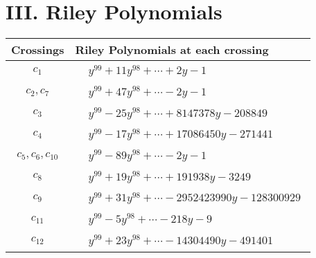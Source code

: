 \documentclass[1p]{elsarticle_modified}
\theoremstyle{definition}
\begin{document}
\centering \section*{ III. Riley Polynomials}
\begin{tabular}{m{50pt}|m{274pt}}
Crossings & \hspace{64pt}Riley Polynomials at each crossing \\
\hline $$\begin{aligned}c_{1}\end{aligned}$$&$\begin{aligned}
&y^{99}+11 y^{98}+\cdots+2 y-1
\end{aligned}$\\
\hline $$\begin{aligned}c_{2},c_{7}\end{aligned}$$&$\begin{aligned}
&y^{99}+47 y^{98}+\cdots-2 y-1
\end{aligned}$\\
\hline $$\begin{aligned}c_{3}\end{aligned}$$&$\begin{aligned}
&y^{99}-25 y^{98}+\cdots+8147378 y-208849
\end{aligned}$\\
\hline $$\begin{aligned}c_{4}\end{aligned}$$&$\begin{aligned}
&y^{99}-17 y^{98}+\cdots+17086450 y-271441
\end{aligned}$\\
\hline $$\begin{aligned}c_{5},c_{6},c_{10}\end{aligned}$$&$\begin{aligned}
&y^{99}-89 y^{98}+\cdots-2 y-1
\end{aligned}$\\
\hline $$\begin{aligned}c_{8}\end{aligned}$$&$\begin{aligned}
&y^{99}+19 y^{98}+\cdots+191938 y-3249
\end{aligned}$\\
\hline $$\begin{aligned}c_{9}\end{aligned}$$&$\begin{aligned}
&y^{99}+31 y^{98}+\cdots-2952423990 y-128300929
\end{aligned}$\\
\hline $$\begin{aligned}c_{11}\end{aligned}$$&$\begin{aligned}
&y^{99}-5 y^{98}+\cdots-218 y-9
\end{aligned}$\\
\hline $$\begin{aligned}c_{12}\end{aligned}$$&$\begin{aligned}
&y^{99}+23 y^{98}+\cdots-14304490 y-491401
\end{aligned}$\\
\hline
\end{tabular}
\vskip 2pc
\end{document}
